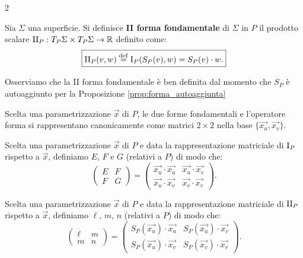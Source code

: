 \begin{multicols*}{2}
    \begin{definition}
        Sia $\Sigma$ una superficie. Si definisce \textbf{II forma fondamentale}
        di $\Sigma$ in $P$ il prodotto scalare $\mathrm{II}_P : T_P \Sigma \times T_P \Sigma \to \mathbb{R}$
        definito come:
        \[
            \boxed{\mathrm{II}_P(v, w) \overset{\mathrm{def}}{=} \mathrm{I}_P(S_P(v), w) = S_P(v) \cdot w.}
        \]
    \end{definition}

    \begin{remark}
        Osserviamo che la II forma fondamentale è ben definita dal momento che
        $S_P$ è autoaggiunto per la Proposizione \ref{prop:forma_autoaggiunta}
    \end{remark}

    \begin{remark}
        Scelta una parametrizzazione $\vec{x}$ di $P$, le due forme fondamentali
        e l'operatore forma
        si rappresentano canonicamente come matrici $2 \times 2$ nella
        base $\{\vec{x_u}, \vec{x_v}\}$.
    \end{remark}

    \begin{definition}
        Scelta una parametrizzazione $\vec{x}$ di $P$ e data la rappresentazione
        matriciale di $\mathrm{I}_P$ rispetto a $\vec{x}$, definiamo $E$, $F$ e $G$ (relativi
        a $P$) di
        modo che:
        \[
            \begin{pmatrix}
                E & F \\
                F & G
            \end{pmatrix} =
            \begin{pmatrix}
                \vec{x_u} \cdot \vec{x_u} & \vec{x_u} \cdot \vec{x_v} \\
                \vec{x_u} \cdot \vec{x_v} & \vec{x_v} \cdot \vec{x_v}
            \end{pmatrix}.
        \]
    \end{definition}

    \begin{definition}
        Scelta una parametrizzazione $\vec{x}$ di $P$ e data la rappresentazione
        matriciale di $\mathrm{II}_P$ rispetto a $\vec{x}$, definiamo $\ell$, $m$, $n$ (relativi
        a $P$) di
        modo che:
        \[
            \begin{pmatrix}
                \ell & m \\
                m    & n
            \end{pmatrix} =
            \begin{pmatrix}
                S_P(\vec{x_u}) \cdot \vec{x_u} & S_P(\vec{x_u}) \cdot \vec{x_v} \\
                S_P(\vec{x_u}) \cdot \vec{x_v} & S_P(\vec{x_v}) \cdot \vec{x_v}
            \end{pmatrix}.
        \]
    \end{definition}


\end{multicols*}

